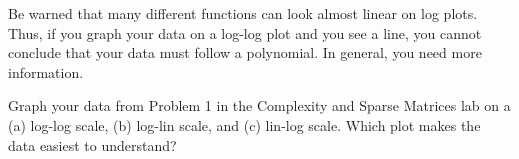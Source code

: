 Be warned that many different functions can look almost linear on log plots. 
Thus, if you graph your data on a log-log plot and you see a line, you cannot conclude that your data must follow a polynomial. 
In general, you need more information.


\begin{problem}
Graph your data from Problem 1 in the Complexity and Sparse Matrices lab on a (a) log-log scale, (b) log-lin scale, and (c) lin-log scale. 
Which plot makes the data easiest to understand?

\end{problem}
